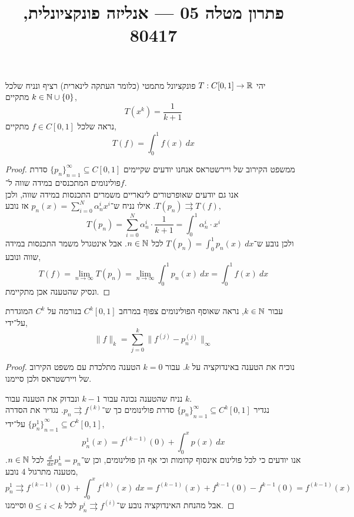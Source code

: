 
\title{פתרון מטלה 05 --- אנליזה פונקציונלית, 80417}


\maketitle
\maketitleprint[teal]

\question{}
יהי $T : C[0, 1] \to \mathbb{R}$ פונקציונל מתמטי (כלומר העתקה לינארית) רציף ונניח שלכל $k \in \mathbb{N} \cup \{ 0 \}$ מתקיים,
\[
	T(x^k)
	= \frac{1}{k + 1}
\]
נראה שלכל $f \in C[0, 1]$ מתקיים,
\[
	T(f)
	= \int_{0}^{1} f(x)\ dx
\]
\begin{proof}
	ממשפט הקירוב של ויירשטראס אנחנו יודעים שקיימים ${\{ p_n \}}_{n = 1}^\infty \subseteq C[0, 1]$ סדרת פולינומים המתכנסים במידה שווה ל־$f$. \\
	אנו גם יודעים שאופרטורים לינאריים משמרים התכנסות במידה שווה, ולכן $T(p_n) \rightrightarrows T(f)$.
	אילו נניח ש־$p_n(x) = \sum_{i = 0}^N \alpha_n^i x^i$ אז נובע,
	\[
		T(p_n)
		= \sum_{i = 0}^N \alpha_n^i \cdot \frac{1}{k + 1}
		= \int_{0}^{1} \alpha_n^i \cdot x^i
	\]
	ולכן נובע ש־$T(p_n) = \int_{0}^{1} p_n(x)\ dx$ לכל $n \in \mathbb{N}$.
	אבל אינטגרל משמר התכנסות במידה שווה ונובע,
	\[
		T(f)
		= \lim_{n \to \infty} T(p_n)
		= \lim_{n \to \infty} \int_{0}^{1} p_n(x)\ dx
		= \int_{0}^{1} f(x)\ dx
	\]
	ונסיק שהטענה אכן מתקיימת.
\end{proof}

\question{}
עבור $k \in \mathbb{N}$,
נראה שאוסף הפולינומים צפוף במרחב $C^k[0, 1]$ בנורמה על $C^k$ המוגדרת על־ידי,
\[
	\lVert f \rVert_k
	= \sum_{j = 0}^k \lVert f^{(j)} - p_n^{(j)} \rVert_\infty
\]
\begin{proof}
	נוכיח את הטענה באינדוקציה על $k$.
	עבור $k = 0$ הטענה מתלכדת עם משפט הקירוב של ויירשטראס ולכן סיימנו.

	נניח שהטענה נכונה עבור $k - 1$ ונבדוק את הטענה עבור $k$. \\
	נגדיר ${\{ p_n \}}_{n = 1}^\infty \subseteq C^k[0, 1]$ סדרת פולינומים כך ש־$p_n \rightrightarrows f^{(k)}$.
	נגדיר את הסדרה ${\{ p_n^1 \}}_{n = 1}^\infty \subseteq C^k[0, 1]$ על־ידי,
	\[
		p_n^1(x) = f^{(k - 1)}(0) + \int_{0}^{x} p(x)\ dx
	\]
	אנו יודעים כי לכל פולינום אינסוף קדומות וכי אף הן פולינומים, וכן ש־$\frac{d}{dx} p_n^1 = p_n$ לכל $n \in \mathbb{N}$.
	מטענה מתרגול 4 נובע,
	\[
		p_n^1
		\rightrightarrows f^{(k - 1)}(0) + \int_0^x f^{(k)}(x)\ dx
		= f^{(k - 1)}(x) + f^{k - 1}(0) - f^{k - 1}(0)
		= f^{(k - 1)}(x)
	\]
	אבל מהנחת האינדוקציה נובע ש־$p_n^i \rightrightarrows f^{(i)}$ לכל $0 \le i < k$ וסיימנו.
\end{proof}


